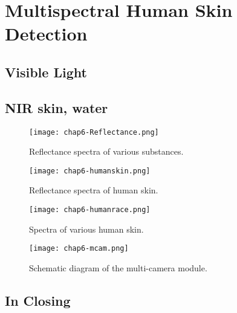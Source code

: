 \chapter{Multispectral Human Skin Detection} %

\label{Chapter6} %


\section{Visible Light}
\section{NIR skin, water}

\begin{compactitem}

\item {}
\end{compactitem}

\begin{figure}[h]
  \label{fig:chap6-Reflectance}
  \centering
	\texttt{[image: chap6-Reflectance.png]}
	\caption{Reflectance spectra of various substances.}
\end{figure}

\begin{figure}[h]
  \label{fig:chap6-humanskin}
  \centering
	\texttt{[image: chap6-humanskin.png]}
	\caption{Reflectance spectra of human skin.}
\end{figure}

\begin{figure}[h]
  \label{fig:chap6-humanrace}
  \centering
	\texttt{[image: chap6-humanrace.png]}
	\caption{Spectra of various human skin.}
\end{figure}

\begin{figure}[h]
  \label{fig:chap6-mcam}
  \centering
	\texttt{[image: chap6-mcam.png]}
	\caption{Schematic diagram of the multi-camera module.}
\end{figure}

\section{In Closing}

